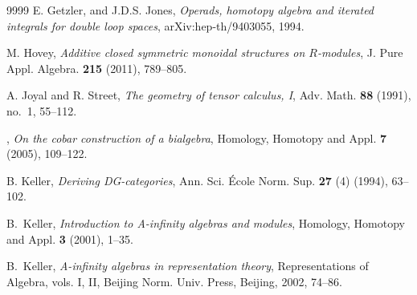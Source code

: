 \documentclass[a4paper, 11pt]{amsart}
\theoremstyle{definition}
\theoremstyle{remark}
\numberwithin{equation}{section}
\begin{document}
\begin{thebibliography}{9999}
 {\sc E. Getzler,  and J.D.S. Jones}, {\em Operads, homotopy algebra and iterated integrals for double loop spaces}, arXiv:hep-th/9403055, 1994.







 {\sc M. Hovey}, {\em Additive closed symmetric monoidal structures on $R$-modules}, J. Pure Appl. Algebra. {\bf 215} (2011), 789--805.

{\sc A. Joyal and R. Street},
{\em The geometry of tensor calculus, I},
Adv. Math. {\bf 88} (1991), no.~1, 55--112.



, {\em On the cobar construction of a bialgebra}, Homology, Homotopy and Appl. {\bf 7} (2005), 109--122.







 {\sc B. Keller}, {\em Deriving DG-categories}, Ann. Sci. \'Ecole Norm. Sup. {\bf 27} (4) (1994), 63--102.

 {\sc B.~Keller}, \emph{Introduction to A-infinity algebras and modules}, Homology, Homotopy and Appl. {\bf 3} (2001), 1--35.

 {\sc B.~Keller}, {\em A-infinity algebras in representation theory}, Representations of Algebra, vols. I, II, Beijing Norm. Univ. Press, Beijing, 2002, 74--86. 



\end{thebibliography}
\end{document}
